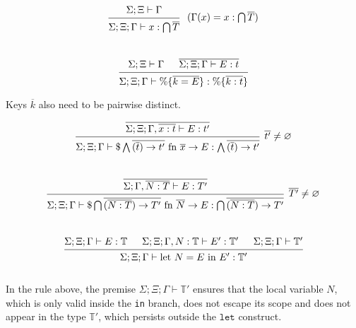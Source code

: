 \documentclass[12pt]{article}
\newcommand{\emptyenv}{\varnothing}
\newcommand{\Gammatop}{\ensuremath{\Xi}}
\newcommand{\Gammabot}{\ensuremath{\Gamma}}
\begin{document}
\[
    \begin{prooftree}
        \hypo{ \Sigma; \Gammatop \vdash \Gammabot }
        \infer1[\;($ \Gammabot(x) = x : \bigcap \overline{T}$)]{ \Sigma; \Gammatop; \Gammabot \vdash  x : \bigcap \overline{T} }
    \end{prooftree}
\] \\

\[
    \begin{prooftree}
        \hypo { \Sigma; \Gammatop \vdash \Gammabot  }
        \hypo { \overline{\Sigma; \Gammatop; \Gammabot \vdash E : t} }
        \infer2{ \Sigma; \Gammatop; \Gammabot \vdash \%\{\overline{k = E}\} : \%\{\overline{k : t}\} }
    \end{prooftree}
\]

Keys $\overline{k}$ also need to be pairwise distinct.

\[
    \begin{prooftree}
        \hypo { \overline{ \Sigma; \Gammatop; \Gammabot, \overline{x : t} \vdash E: t'} }
        \infer1[$\overline{t'} \neq \emptyenv$]{ \Sigma; \Gammatop; \Gammabot \vdash \$ \bigwedge \overline{(\overline{t}) \rightarrow t'} \text{ fn } \overline{x} \rightarrow E : \bigwedge \overline{ (\overline{t}) \rightarrow t'} }
    \end{prooftree}
\] \\

\[
    \begin{prooftree}
        \hypo { \overline{ \Sigma; \Gamma, \overline{N : T} \vdash E: T'} }
        \infer1[$\overline{T'} \neq \emptyenv$]{ \Sigma; \Gammatop; \Gammabot \vdash \$ \bigcap \overline{(\overline{N : T}) \rightarrow T'} \text{ fn } \overline{N} \rightarrow E : \bigcap \overline{(\overline{N : T }) \rightarrow T'} }
    \end{prooftree}
\] \\

\[
    \begin{prooftree}
        \hypo { \Sigma; \Gammatop; \Gammabot \vdash E : \mathbb{T} }
        \hypo { \Sigma; \Gammatop; \Gammabot, N : \mathbb{T} \vdash E' : \mathbb{T}' }
        \hypo { \Sigma; \Gammatop; \Gammabot \vdash \mathbb{T}' }
        \infer3{ \Sigma; \Gammatop; \Gammabot \vdash \text{let } N = E \text{ in } E' : \mathbb{T}' }
    \end{prooftree}
\] \\

In the rule above, the premise $\Sigma; \Gammatop; \Gammabot \vdash \mathbb{T}'$
ensures that the local variable $N$, which is only valid inside the \texttt{in} branch,
does not escape its scope and does not appear in the type $\mathbb{T}'$,
which persists outside the $\texttt{let}$ construct.
\end{document}
